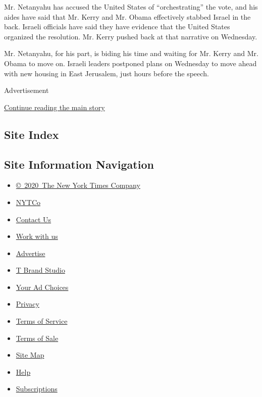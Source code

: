 Mr. Netanyahu has accused the United States of ``orchestrating'' the
vote, and his aides have said that Mr. Kerry and Mr. Obama effectively
stabbed Israel in the back. Israeli officials have said they have
evidence that the United States organized the resolution. Mr. Kerry
pushed back at that narrative on Wednesday.

Mr. Netanyahu, for his part, is biding his time and waiting for Mr.
Kerry and Mr. Obama to move on. Israeli leaders postponed plans on
Wednesday to move ahead with new housing in East Jerusalem, just hours
before the speech.

Advertisement

\protect\hyperlink{after-bottom}{Continue reading the main story}

\hypertarget{site-index}{%
\subsection{Site Index}\label{site-index}}

\hypertarget{site-information-navigation}{%
\subsection{Site Information
Navigation}\label{site-information-navigation}}

\begin{itemize}
\tightlist
\item
  \href{https://help.nytimes3xbfgragh.onion/hc/en-us/articles/115014792127-Copyright-notice}{©~2020~The
  New York Times Company}
\end{itemize}

\begin{itemize}
\tightlist
\item
  \href{https://www.nytco.com/}{NYTCo}
\item
  \href{https://help.nytimes3xbfgragh.onion/hc/en-us/articles/115015385887-Contact-Us}{Contact
  Us}
\item
  \href{https://www.nytco.com/careers/}{Work with us}
\item
  \href{https://nytmediakit.com/}{Advertise}
\item
  \href{http://www.tbrandstudio.com/}{T Brand Studio}
\item
  \href{https://www.nytimes3xbfgragh.onion/privacy/cookie-policy\#how-do-i-manage-trackers}{Your
  Ad Choices}
\item
  \href{https://www.nytimes3xbfgragh.onion/privacy}{Privacy}
\item
  \href{https://help.nytimes3xbfgragh.onion/hc/en-us/articles/115014893428-Terms-of-service}{Terms
  of Service}
\item
  \href{https://help.nytimes3xbfgragh.onion/hc/en-us/articles/115014893968-Terms-of-sale}{Terms
  of Sale}
\item
  \href{https://spiderbites.nytimes3xbfgragh.onion}{Site Map}
\item
  \href{https://help.nytimes3xbfgragh.onion/hc/en-us}{Help}
\item
  \href{https://www.nytimes3xbfgragh.onion/subscription?campaignId=37WXW}{Subscriptions}
\end{itemize}
